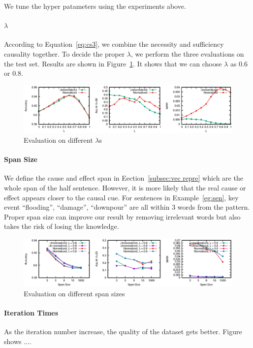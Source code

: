 We tune the hyper patameters using the experiments above.
\paragraph{$\lambda$}
According to Equation~\ref{eq:cs3}, we combine the necessity and sufficiency causality together. To decide the proper $\lambda$, we perform the three evaluations on the test set. Results are shown in Figure~\ref{fig:lambda}. It shows that we can choose $\lambda$ as 0.6 or 0.8.

\begin{figure}[th]
	\centering
	\includegraphics[width=2\columnwidth]{lambda}
	\caption{Evaluation on different $\lambda$s}
	\label{fig:lambda}
\end{figure}


\paragraph{Span Size}
We define the cause and effect span in Eection~\ref{subsec:vec repre} which are the whole span of the half sentence. However, it is more likely that the real cause or effect appears closer to the causal cue. For sentences in Example~\ref{eg:sen}, key event ``flooding'', ``damage'', ``downpour'' are all within 3 words from the pattern. Proper span size can improve our result by removing irrelevant words but also takes the risk of losing the knowledge. 

\begin{figure}[th]
	\centering
	\includegraphics[width=2\columnwidth]{spansize}
	\caption{Evaluation on different span sizes}
	\label{fig:spansize}
\end{figure}

\paragraph{Iteration Times}
As the iteration number increase, the quality of the dataset gets better. Figure shows ....


